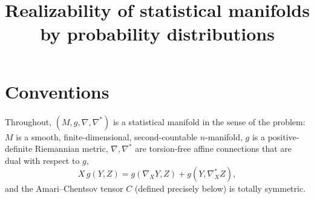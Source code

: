 \documentclass{amsart}
\theoremstyle{definition}
\theoremstyle{remark}
\begin{document}
\title{Realizability of statistical manifolds by probability distributions}
\maketitle

\section{Conventions}

Throughout, $(M,g,\nabla,\nabla^{*})$ is a statistical manifold in the sense of
the problem: $M$ is a smooth, finite-dimensional, second-countable $n$-manifold,
$g$ is a positive-definite Riemannian metric, $\nabla,\nabla^{*}$ are
torsion-free affine connections that are dual with respect to $g$,
\begin{equation}\label{eq:dual}
  X\,g(Y,Z)=g(\nabla_{X}Y,Z)+g(Y,\nabla^{*}_{X}Z),
\end{equation}
and the Amari--Chentsov tensor $C$ (defined precisely below) is totally
symmetric.
\end{document}
